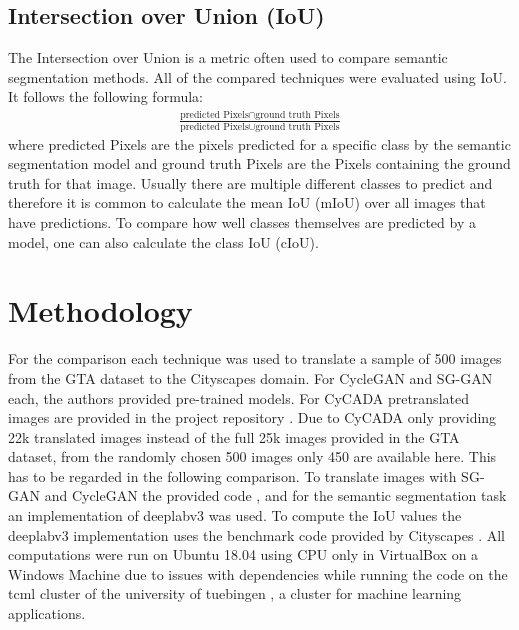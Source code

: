 \subsection{Intersection over Union (IoU)}
The Intersection over Union is a metric often used to compare semantic segmentation methods. All of the compared techniques were evaluated using IoU. It follows the following formula:
\begin{align*}
	\frac{\text{predicted Pixels} \cap \text{ground truth Pixels}}{\text{predicted Pixels} \cup \text{ground truth Pixels}}
\end{align*}
where predicted Pixels are the pixels predicted for a specific class by the semantic segmentation model and ground truth Pixels are the Pixels containing the ground truth for that image. Usually there are multiple different classes to predict and therefore it is common to calculate the mean IoU (mIoU) over all images that have predictions. To compare how well classes themselves are predicted by a model, one can also calculate the class IoU (cIoU).

\section{Methodology}
For the comparison each technique was used to translate a sample of 500 images from the GTA dataset to the Cityscapes domain. For CycleGAN and SG-GAN each, the authors provided pre-trained models. For CyCADA pretranslated images are provided in the project repository \cite{CyCADA}. Due to CyCADA only providing 22k translated images instead of the full 25k images provided in the GTA dataset, from the randomly chosen 500 images only 450 are available here. This has to be regarded in the following comparison. To translate images with SG-GAN and CycleGAN the provided code \cite{SG},\cite{Cycle} and for the semantic segmentation task an implementation \cite{DLR} of deeplabv3 \cite{DBLP:journals/corr/ChenPSA17} was used. To compute the IoU values the deeplabv3 implementation uses the benchmark code provided by Cityscapes \cite{CSR}. All computations were run on Ubuntu 18.04 using CPU only in VirtualBox on a Windows Machine due to issues with dependencies while running the code on the tcml cluster of the university of tuebingen \cite{tcml}, a cluster for machine learning applications.

